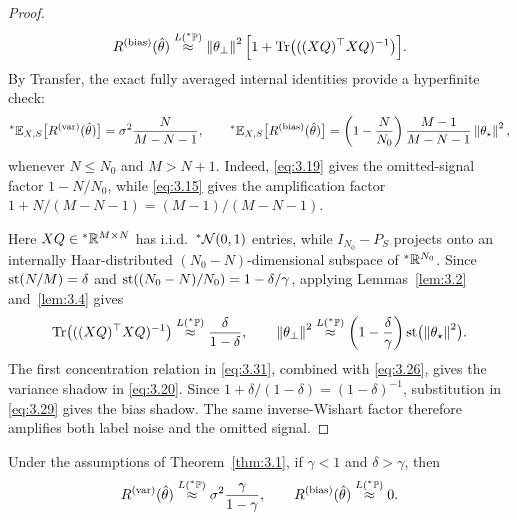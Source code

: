 \begin{proof}
\begin{equation}\label{eq:3.29}
R^{(\mathrm{bias})}(\hat{\theta}) \stackrel{L({}^*\mathbb{P})}{\approx} \left\lVert \theta_\perp \right\rVert^2 \Bigl[1 + \operatorname{Tr}\bigl(((XQ)^\top XQ)^{-1}\bigr)\Bigr].
\end{equation}
By Transfer, the exact fully averaged internal identities provide a hyperfinite check:
\begin{equation}\label{eq:3.30}
{}^*\mathbb{E}_{X, S}\bigl[R^{(\mathrm{var})}(\hat{\theta})\bigr] = \sigma^2 \frac{N}{M - N - 1}, \qquad {}^*\mathbb{E}_{X, S}\bigl[R^{(\mathrm{bias})}(\hat{\theta})\bigr] = \left(1 - \frac{N}{N_0}\right)\frac{M - 1}{M - N - 1}\left\lVert \theta_\star \right\rVert^2,
\end{equation}
whenever $N \le N_0$ and $M > N + 1$. Indeed, \eqref{eq:3.19} gives the omitted-signal factor $1 - N / N_0$, while \eqref{eq:3.15} gives the amplification factor $1 + N / (M - N - 1) = (M - 1) / (M - N - 1)$.

Here $XQ \in {}^*\mathbb{R}^{M \times N}$ has i.i.d.\ ${}^*\mathcal{N}(0, 1)$ entries, while $I_{N_0} - P_S$ projects onto an internally Haar-distributed $(N_0 - N)$-dimensional subspace of ${}^*\mathbb{R}^{N_0}$. Since $\operatorname{st}(N / M) = \delta$ and $\operatorname{st}((N_0 - N) / N_0) = 1 - \delta / \gamma$, applying Lemmas~\ref{lem:3.2} and~\ref{lem:3.4} gives
\begin{equation}\label{eq:3.31}
\operatorname{Tr}\bigl(((XQ)^\top XQ)^{-1}\bigr) \stackrel{L({}^*\mathbb{P})}{\approx} \frac{\delta}{1 - \delta}, \qquad \left\lVert \theta_\perp \right\rVert^2 \stackrel{L({}^*\mathbb{P})}{\approx} \left(1 - \frac{\delta}{\gamma}\right)\operatorname{st}\bigl(\left\lVert \theta_\star \right\rVert^2\bigr).
\end{equation}
The first concentration relation in \eqref{eq:3.31}, combined with \eqref{eq:3.26}, gives the variance shadow in \eqref{eq:3.20}. Since $1 + \delta / (1 - \delta) = (1 - \delta)^{-1}$, substitution in \eqref{eq:3.29} gives the bias shadow. The same inverse-Wishart factor therefore amplifies both label noise and the omitted signal.
\end{proof}

\begin{proposition}\label{prop:3.6}
Under the assumptions of Theorem~\ref{thm:3.1}, if $\gamma < 1$ and $\delta > \gamma$, then
\begin{equation}\label{eq:3.32}
R^{(\mathrm{var})}(\hat{\theta}) \stackrel{L({}^*\mathbb{P})}{\approx} \sigma^2 \frac{\gamma}{1 - \gamma}, \qquad R^{(\mathrm{bias})}(\hat{\theta}) \stackrel{L({}^*\mathbb{P})}{\approx} 0.
\end{equation}
\end{proposition}

